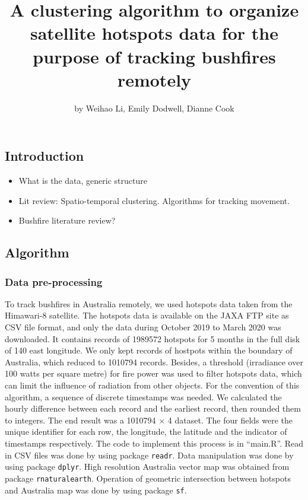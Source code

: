 \title{A clustering algorithm to organize satellite hotspots data for the
purpose of tracking bushfires remotely}
\author{by Weihao Li, Emily Dodwell, Dianne Cook}

\maketitle


\hypertarget{introduction}{%
\subsection{Introduction}\label{introduction}}

\begin{itemize}
\tightlist
\item
  What is the data, generic structure
\item
  Lit review: Spatio-temporal clustering. Algorithms for tracking
  movement.
\item
  Bushfire literature review?
\end{itemize}

\hypertarget{algorithm}{%
\subsection{Algorithm}\label{algorithm}}

\hypertarget{data-pre-processing}{%
\subsubsection{Data pre-processing}\label{data-pre-processing}}

To track bushfires in Australia remotely, we used hotspots data taken
from the Himawari-8 satellite. The hotspots data is available on the
JAXA FTP site as CSV file format, and only the data during October 2019
to March 2020 was downloaded. It contains records of 1989572 hotspots
for 5 months in the full disk of 140 \textdegree east longitude. We only
kept records of hostpots within the boundary of Australia, which reduced
to 1010794 records. Besides, a threshold (irradiance over 100 watts per
square metre) for fire power was used to filter hotspots data, which can
limit the influence of radiation from other objects. For the convention
of this algorithm, a sequence of discrete timestamps was needed. We
calculated the hourly difference between each record and the earliest
record, then rounded them to integers. The end result was a 1010794
\(\times\) 4 dataset. The four fields were the unique identifier for
each row, the longitude, the latitude and the indicator of timestamps
respectively. The code to implement this process is in ``main.R''. Read
in CSV files was done by using package \texttt{readr}. Data manipulation
was done by using package \texttt{dplyr}. High resolution Australia
vector map was obtained from package \texttt{rnaturalearth}. Operation
of geometric intersection between hotspots and Australia map was done by
using package \texttt{sf}.


